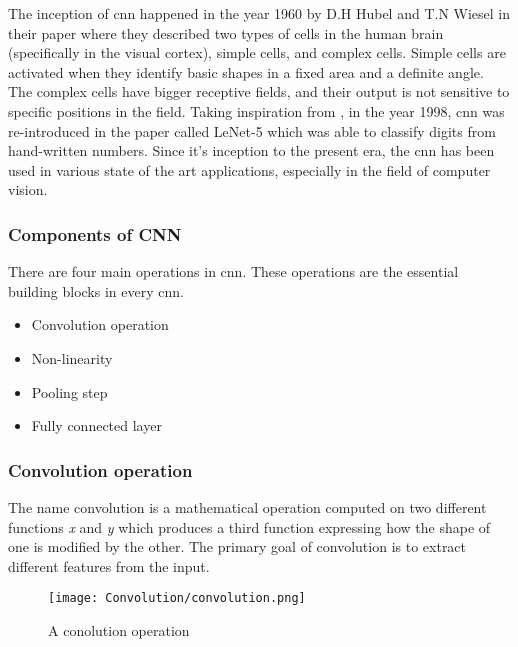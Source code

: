 The inception of \ac{cnn} happened in the year 1960 by D.H Hubel and T.N Wiesel in their paper \cite{hubel1962receptive} where they described two types of cells in the human brain (specifically in the visual cortex), simple cells, and complex cells. Simple cells are activated when they identify basic shapes in a fixed area and a definite angle. The complex cells have bigger receptive fields, and their output is not sensitive to specific positions in the field. Taking inspiration from \cite{hubel1962receptive}, in the year 1998, \ac{cnn} was re-introduced in the paper \cite{lecun1998gradient} called LeNet-5 which was able to classify digits from hand-written numbers. Since it's inception to the present era, the \ac{cnn} has been used in various state of the art applications, especially in the field of computer vision.

\subsubsection{Components of CNN}

There are four main operations in \ac{cnn}. These operations are the essential building blocks in every \ac{cnn}.

\begin{itemize}
    \item Convolution operation
    \item Non-linearity
    \item Pooling step
    \item Fully connected layer
\end{itemize}

\subsubsection{Convolution operation}

The name convolution is a mathematical operation computed on two different functions \textit{x} and \textit{y} which produces a third function expressing how the shape of one is modified by the other. The primary goal of convolution is to extract different features from the input.

\begin{figure}[h!]
    \centering
        \texttt{[image: Convolution/convolution.png]}
    \caption{A conolution operation \cite{VoPa}}
    \label{convolution}
\end{figure}

\par


